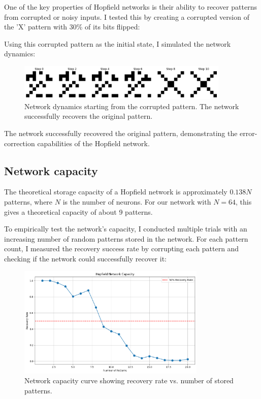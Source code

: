 \documentclass{article}
\begin{document}
One of the key properties of Hopfield networks is their ability to recover patterns from corrupted or noisy inputs. I tested this by creating a corrupted version of the 'X' pattern with 30\% of its bits flipped:


Using this corrupted pattern as the initial state, I simulated the network dynamics:

\begin{figure}[H]
\centering
\includegraphics[width=0.9\textwidth]{Network Activity Corrupted X.png}
\caption{Network dynamics starting from the corrupted pattern. The network successfully recovers the original pattern.}
\label{fig:recovery}
\end{figure}

The network successfully recovered the original pattern, demonstrating the error-correction capabilities of the Hopfield network.


\subsection{Network capacity}

The theoretical storage capacity of a Hopfield network is approximately $0.138N$ patterns, where $N$ is the number of neurons. For our network with $N=64$, this gives a theoretical capacity of about 9 patterns.

To empirically test the network's capacity, I conducted multiple trials with an increasing number of random patterns stored in the network. For each pattern count, I measured the recovery success rate by corrupting each pattern and checking if the network could successfully recover it:

\begin{figure}[H]
\centering
\includegraphics[width=0.8\textwidth]{capacity_curve.png}
\caption{Network capacity curve showing recovery rate vs. number of stored patterns.}
\label{fig:capacity}
\end{figure}
\end{document}

